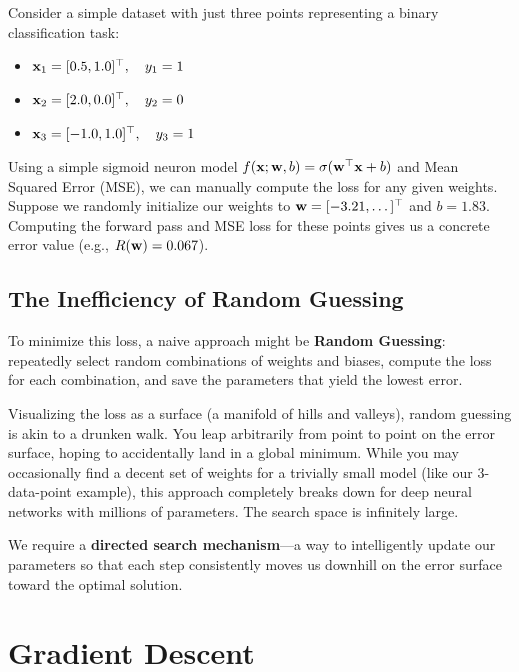Consider a simple dataset with just three points representing a binary classification task:
\begin{itemize}
    \item $\mathbf{x}_1 = [0.5, 1.0]^\top, \quad y_1 = 1$
    \item $\mathbf{x}_2 = [2.0, 0.0]^\top, \quad y_2 = 0$
    \item $\mathbf{x}_3 = [-1.0, 1.0]^\top, \quad y_3 = 1$
\end{itemize}

Using a simple sigmoid neuron model $f(\mathbf{x}; \mathbf{w}, b) = \sigma(\mathbf{w}^\top \mathbf{x} + b)$ and Mean Squared Error (MSE), we can manually compute the loss for any given weights. Suppose we randomly initialize our weights to $\mathbf{w} = [-3.21, \dots]^\top$ and $b = 1.83$. Computing the forward pass and MSE loss for these points gives us a concrete error value (e.g., $R(\mathbf{w}) = 0.067$). 

\subsection{The Inefficiency of Random Guessing}

To minimize this loss, a naive approach might be \textbf{Random Guessing}: repeatedly select random combinations of weights and biases, compute the loss for each combination, and save the parameters that yield the lowest error. 

Visualizing the loss as a surface (a manifold of hills and valleys), random guessing is akin to a drunken walk. You leap arbitrarily from point to point on the error surface, hoping to accidentally land in a global minimum. While you may occasionally find a decent set of weights for a trivially small model (like our 3-data-point example), this approach completely breaks down for deep neural networks with millions of parameters. The search space is infinitely large.

We require a \textbf{directed search mechanism}---a way to intelligently update our parameters so that each step consistently moves us downhill on the error surface toward the optimal solution.


\section{Gradient Descent}

